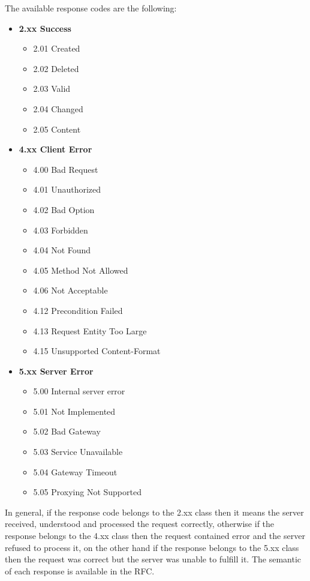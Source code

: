 	The available response codes are the following:
	\begin{itemize}
		\item \textbf{2.xx Success}
		\begin{itemize}
			\item 2.01 Created
			\item 2.02 Deleted
			\item 2.03 Valid
			\item 2.04 Changed
			\item 2.05 Content
		\end{itemize}
		
		\item \textbf{4.xx Client Error}
		\begin{itemize}
			\item 4.00 Bad Request
			\item 4.01 Unauthorized
			\item 4.02 Bad Option
			\item 4.03 Forbidden
			\item 4.04 Not Found
			\item 4.05 Method Not Allowed
			\item 4.06 Not Acceptable
			\item 4.12 Precondition Failed
			\item 4.13  Request Entity Too Large
			\item 4.15 Unsupported Content-Format
		\end{itemize}		
		
		\item \textbf{5.xx Server Error}
		\begin{itemize}
			\item 5.00 Internal server error
			\item 5.01 Not Implemented
			\item 5.02 Bad Gateway
			\item 5.03 Service Unavailable
			\item 5.04 Gateway Timeout
			\item 5.05 Proxying Not Supported
		\end{itemize}
	\end{itemize}
	
	In general, if the response code belongs to the 2.xx class then it means the server received, understood and processed the request correctly, otherwise if the response belongs to the 4.xx class then the request contained error and the server refused to process it, on the other hand if the response belongs to the 5.xx class then the request was correct but the server was unable to fulfill it.\newline
	The semantic of each response is available in the RFC.\newline
	
